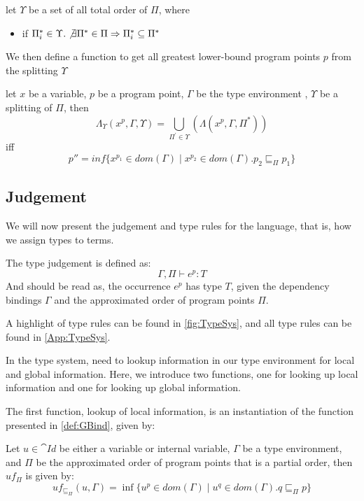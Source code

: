 \documentclass[../../master.tex]{subfiles}
\begin{document}
\begin{definition}
	let $\Upsilon$ be a set of all total order of $\Pi$, where
	\begin{itemize}
		\item if $\Pi^{*}_i\in\Upsilon.\not\exists \Pi^{*}\in\Pi\Rightarrow\Pi^{*}_i\subseteq\Pi^{*}$
	\end{itemize}
\end{definition}

We then define a function to get all greatest lower-bound program points $p$ from the splitting $\Upsilon$
\begin{definition}
	let $x$ be a variable, $p$ be a program point, $\Gamma$ be the type environment , $\Upsilon$ be a splitting of $\Pi$, then
	$$\Lambda_\Upsilon(x^p, \Gamma, \Upsilon)=\bigcup_{\Pi^{'}\in\Upsilon}(\Lambda(x^p,\Gamma,\Pi^{*}))$$
	iff
	$$p'' = inf\{x^{p_1}\in dom(\Gamma)\mid x^{p_2}\in dom(\Gamma).p_2\sqsubseteq_\Pi p_1\}$$
\end{definition}
\fi

\subsection{Judgement}\label{sec:Judge}
We will now present the judgement and type rules for the language, that is, how we assign types to terms.

The type judgement is defined as:
$$\Gamma,\Pi\vdash e^p: T$$
And should be read as, the occurrence $e^p$ has type $T$, given the dependency bindings $\Gamma$ and the approximated order of program points $\Pi$.

A highlight of type rules can be found in \cref{fig:TypeSys}, and all type rules can be found in \cref{App:TypeSys}.

In the type system, need to lookup information in our type environment for local and global information.
Here, we introduce two functions, one for looking up local information and one for looking up global information.

The first function, lookup of local information, is an instantiation of the function presented in \cref{def:GBind}, given by:
\begin{definition}[]
	Let $u\in \cat{Id}$ be either a variable or internal variable, $\Gamma$ be a type environment, and $\Pi$ be the approximated order of program points that is a partial order, then $uf_\Pi$ is given by:
	$$uf_{\sqsubseteq_\Pi}(u,\Gamma)=\inf\{u^p\in dom(\Gamma)\mid u^q\in dom(\Gamma).q\sqsubseteq_\Pi p\}$$
\end{definition}
\end{document}
